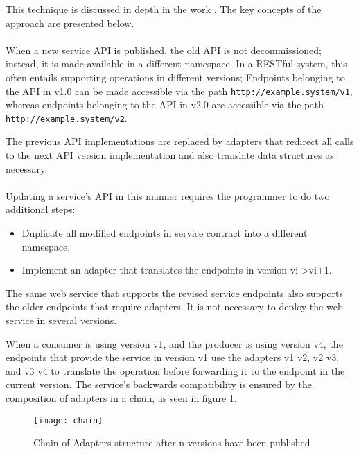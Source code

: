 This technique is discussed in depth in the work \cite{13}. The key concepts of the approach are presented below.

\paragraph{}

When a new service API is published, the old API is not decommissioned;
instead, it is made available in a different namespace.
In a RESTful system, this often entails supporting operations in different versions;
Endpoints belonging to the API in v1.0 can be made accessible via the path \texttt{http://example.system/v1},
whereas endpoints belonging to the API in v2.0 are accessible via the path \texttt{http://example.system/v2}.

The previous API implementations are replaced by adapters that redirect all calls to the next API version implementation and also translate data structures as necessary.

\paragraph{}

Updating a service's API in this manner requires the programmer to do two additional steps:
\begin{itemize}
    \item Duplicate all modified endpoints in service contract into a different namespace.
    \item Implement an adapter that translates the endpoints in version vi->vi+1.
\end{itemize}

The same web service that supports the revised service endpoints also supports the older endpoints that require adapters.
It is not necessary to deploy the web service in several versions.

When a consumer is using version v1, and the producer is using version v4, the endpoints that provide the service
in version v1 use the adapters v1 \textrightarrow v2, v2 \textrightarrow v3, and v3 \textrightarrow v4 to translate the operation before forwarding it to the endpoint in the current version.
The service's backwards compatibility is ensured by the composition of adapters in a chain, as seen in figure \ref{fig:chain}.

\begin{figure}[htbp]
    \centering
    \texttt{[image: chain]}
    \caption{Chain of Adapters structure
    after n versions have been published }
    \label{fig:chain}
\end{figure}

